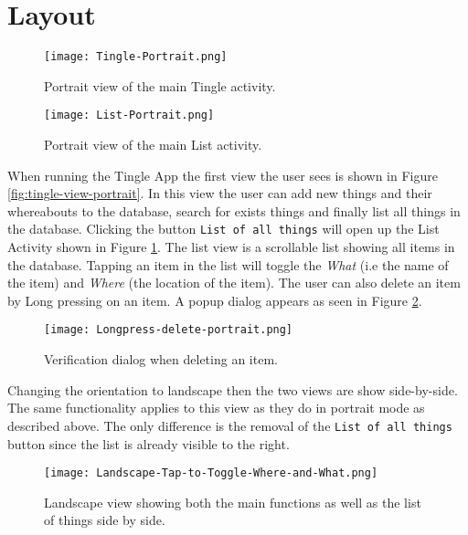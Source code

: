 \section{Layout}

\begin{figure}[!htb]
		\centering
		\texttt{[image: Tingle-Portrait.png]}
		\caption{Portrait view of the main Tingle activity.}
		\label{fig:tingle-view-portrait}
	\endminipage\hfill
		\centering
		\texttt{[image: List-Portrait.png]}
		\caption{Portrait view of the main List activity.}
		\label{fig:list-view-portrait}
	\endminipage\hfill
\end{figure}

When running the Tingle App the first view the user sees is shown in Figure \ref{fig:tingle-view-portrait}. In this view the user can add new things and their whereabouts to the database, search for exists things and finally list all things in the database. Clicking the button \texttt{List of all things} will open up the List Activity shown in Figure \ref{fig:list-view-portrait}. The list view is a scrollable list showing all items in the database. Tapping an item in the list will toggle the \emph{What} (i.e the name of the item) and \emph{Where} (the location of the item). The user can also delete an item by Long pressing on an item. A popup dialog appears as seen in Figure \ref{fig:delete-verification-dialog}.

\begin{figure}[H]
	\centering
	\texttt{[image: Longpress-delete-portrait.png]}
	\caption{Verification dialog when deleting an item.}
	\label{fig:delete-verification-dialog}
\end{figure}


Changing the orientation to landscape then the two views are show side-by-side. The same functionality applies to this view as they do in portrait mode as described above. The only difference is the removal of the \texttt{List of all things} button since the list is already visible to the right.

\begin{figure}[H]
	\centering
	\texttt{[image: Landscape-Tap-to-Toggle-Where-and-What.png]}
	\caption{Landscape view showing both the main functions as well as the list of things side by side.}
	\label{fig:landscape-main-view}
\end{figure}

